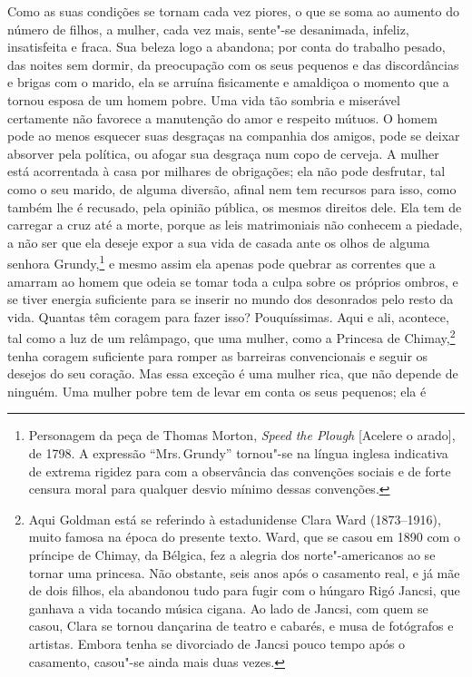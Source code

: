 Como as suas condições se tornam cada vez piores, o que se soma ao
aumento do número de filhos, a mulher, cada vez mais, sente"-se
desanimada, infeliz, insatisfeita e fraca. Sua beleza logo a abandona;
por conta do trabalho pesado, das noites sem dormir, da preocupação com
os seus pequenos e das discordâncias e brigas com o marido, ela se
arruína fisicamente e amaldiçoa o momento que a tornou esposa de um
homem pobre. Uma vida tão sombria e miserável certamente não favorece a
manutenção do amor e respeito mútuos. O homem pode ao menos esquecer
suas desgraças na companhia dos amigos, pode se deixar absorver pela
política, ou afogar sua desgraça num copo de cerveja. A mulher está
acorrentada à casa por milhares de obrigações; ela não pode desfrutar,
tal como o seu marido, de alguma diversão, afinal nem tem recursos para
isso, como também lhe é recusado, pela opinião pública, os mesmos
direitos dele. Ela tem de carregar a cruz até a morte, porque as
leis matrimoniais não conhecem a piedade, a não ser que ela deseje expor
a sua vida de casada ante os olhos de alguma senhora Grundy,\footnote{Personagem
  da peça de Thomas Morton, \emph{Speed the Plough} {[}Acelere o
  arado{]}, de 1798. A expressão ``Mrs.\,Grundy'' tornou"-se na língua
  inglesa indicativa de extrema rigidez para com a observância das
  convenções sociais e de forte censura moral para qualquer desvio
  mínimo dessas convenções.} e mesmo assim ela apenas pode quebrar as
correntes que a amarram ao homem que odeia se tomar toda a culpa
sobre os próprios ombros, e se tiver energia suficiente para se inserir
no mundo dos desonrados pelo resto da vida. Quantas têm coragem para
fazer isso? Pouquíssimas. Aqui e ali, acontece, tal como a luz de um
relâmpago, que uma mulher, como a Princesa de Chimay,\footnote{Aqui Goldman está se referindo à estadunidense Clara Ward (1873--1916), muito famosa na época do presente texto. Ward, que se casou em 1890 com o príncipe de Chimay, da Bélgica, fez a alegria dos norte"-americanos ao se tornar uma princesa. Não obstante, seis anos após o casamento real, e já mãe de dois filhos, ela abandonou tudo para fugir com o húngaro Rigó Jancsi, que ganhava a vida tocando música cigana. Ao lado de Jancsi, com quem se casou, Clara se tornou dançarina de teatro e cabarés, e musa de fotógrafos e artistas. Embora tenha se divorciado de Jancsi pouco tempo após o casamento, casou"-se ainda mais duas vezes.} tenha coragem
suficiente para romper as barreiras convencionais e seguir os desejos do
seu coração. Mas essa exceção é uma mulher rica, que não depende de
ninguém. Uma mulher pobre tem de levar em conta os seus pequenos; ela é
